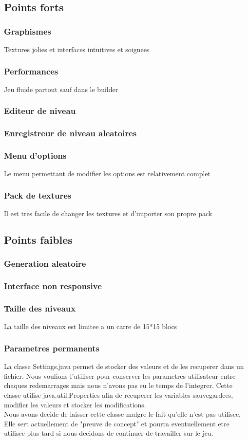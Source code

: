 \documentclass[../main.tex]{subfiles}
\begin{document}
\subsection{Points forts}
\subsubsection{Graphismes}
Textures jolies et interfaces intuitives et soignees
\subsubsection{Performances}
Jeu fluide partout sauf dans le builder
\subsubsection{Editeur de niveau}
\subsubsection{Enregistreur de niveau aleatoires}
\subsubsection{Menu d'options}
Le menu permettant de modifier les options est relativement complet
\subsubsection{Pack de textures}
Il est tres facile de changer les textures et d'importer son propre pack

\subsection{Points faibles}
\subsubsection{Generation aleatoire}
\subsubsection{Interface non responsive}
\subsubsection{Taille des niveaux}
La taille des niveaux est limitee a un carre de 15*15 blocs

\subsubsection{Parametres permanents}
La classe Settings.java permet de stocker des valeurs et de les recuperer dans un fichier. Nous voulions l'utiliser pour conserver les parametres utilisateur entre chaques redemarrages mais nous n'avons pas eu le temps de l'integrer. Cette classe utilise java.util.Properties afin de recuperer les variables sauvegardees, modifier les valeurs et stocker les modifications. \\

Nous avons decide de laisser cette classe malgre le fait qu'elle n'est pas utilisee. Elle sert actuellement de "preuve de concept" et pourra eventuellement etre utilisee plus tard si nous decidons de continuer de travailler sur le jeu.
\end{document}
